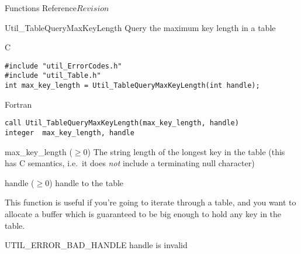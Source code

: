 \begin{cactuspart}{ Functions Reference}{}{$Revision$}

\begin{FunctionDescription}{Util\_TableQueryMaxKeyLength}
\label{Util-TableQueryMaxKeyLength}
Query the maximum key length in a table

\begin{SynopsisSection}
\begin{Synopsis}{C}
\begin{verbatim}
#include "util_ErrorCodes.h"
#include "util_Table.h"
int max_key_length = Util_TableQueryMaxKeyLength(int handle);
\end{verbatim}
\end{Synopsis}
\begin{Synopsis}{Fortran}
\begin{verbatim}
call Util_TableQueryMaxKeyLength(max_key_length, handle)
integer  max_key_length, handle
\end{verbatim}
\end{Synopsis}
\end{SynopsisSection}

\begin{ResultSection}
\begin{Result}{max\_key\_length ($\ge 0$)}
The string length of the longest key in the table
(this has C  semantics, i.e.\ it does {\em not\/}
include a terminating null character)
\end{Result}
\end{ResultSection}

\begin{ParameterSection}
\begin{Parameter}{handle ($\ge 0$)}
handle to the table
\end{Parameter}
\end{ParameterSection}

\begin{Discussion}
This function is useful if you're going to iterate through a table,
and you want to allocate a buffer which is guaranteed to be big enough
to hold any key in the table.
\end{Discussion}

\begin{ErrorSection}
\begin{Error}{UTIL\_ERROR\_BAD\_HANDLE}
handle is invalid
\end{Error}
\end{ErrorSection}


\end{FunctionDescription}
\end{cactuspart}
